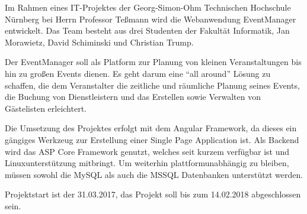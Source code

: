 

Im Rahmen eines IT-Projektes der Georg-Simon-Ohm Technischen Hochschule
Nürnberg bei Herrn Professor Teßmann wird die Webanwendung EventManager entwickelt.
Das Team besteht aus drei Studenten der Fakultät Informatik, Jan Morawietz, David Schiminski und Christian Trump.

Der EventManager soll als Platform zur Planung von kleinen Veranstaltungen bis hin zu großen Events dienen. Es geht darum eine \enquote{all around} Lösung zu schaffen, die dem Veranstalter die zeitliche und räumliche Planung seines Events, die Buchung von Dienstleistern und das Erstellen sowie Verwalten von Gästelisten erleichtert.

Die Umsetzung des Projektes erfolgt mit dem Angular Framework, da dieses ein gängiges Werkzeug zur Erstellung einer Single Page Application ist. Als Backend wird das ASP Core Framework genutzt, welches seit kurzem verfügbar ist und Linuxunterstützung mitbringt. Um weiterhin plattformunabhängig zu bleiben, müssen sowohl die MySQL als auch die MSSQL Datenbanken unterstützt werden.

Projektstart ist der 31.03.2017, das Projekt soll bis zum 14.02.2018 abgeschlossen sein.
